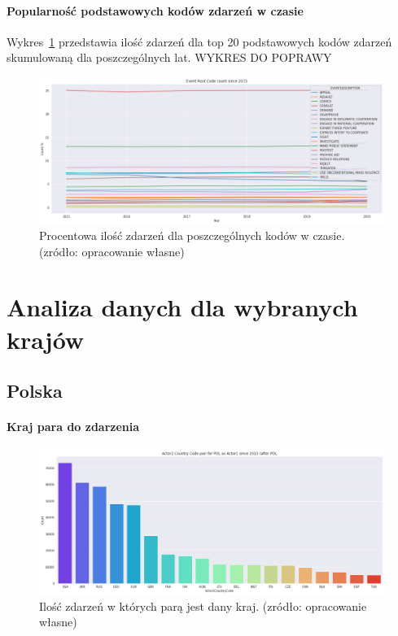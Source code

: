 \documentclass[11pt]{report}
\begin{document}
    \paragraph{Popularność podstawowych kodów zdarzeń w czasie}
    Wykres~\ref{fig:GLOBALERCperc} przedstawia ilość zdarzeń dla top 20 podstawowych kodów zdarzeń skumulowaną dla poszczególnych lat.
    WYKRES DO POPRAWY
    \begin{figure}[ht]
        \centering
        \includegraphics[width=1 \textwidth]{fig/GLOBAL/ERCperc.png}
        \caption{Procentowa ilość zdarzeń dla poszczególnych kodów w czasie. (zródło: opracowanie własne)}
        \label{fig:GLOBALERCperc}
    \end{figure}


    \section{Analiza danych dla wybranych krajów}

    \subsection{Polska}

    \paragraph{Kraj para do zdarzenia}

    \begin{figure}[ht]
        \centering
        \includegraphics[width=1 \textwidth]{fig/PL/PLactor2Pair.png}
        \caption{Ilość zdarzeń w których parą jest dany kraj. (zródło: opracowanie własne)}
        \label{fig:PLpair}
    \end{figure}
\end{document}
